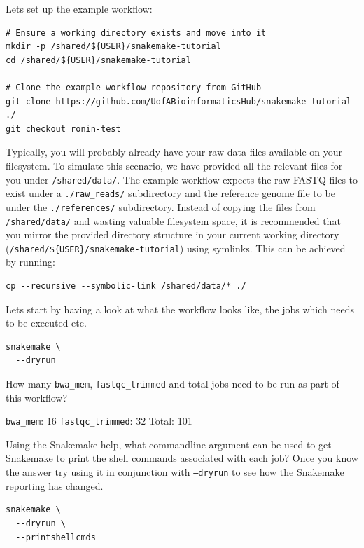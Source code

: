 \begin{steps}

Lets set up the example workflow:

\begin{lstlisting}
# Ensure a working directory exists and move into it
mkdir -p /shared/${USER}/snakemake-tutorial
cd /shared/${USER}/snakemake-tutorial

# Clone the example workflow repository from GitHub
git clone https://github.com/UofABioinformaticsHub/snakemake-tutorial ./
git checkout ronin-test
\end{lstlisting}

Typically, you will probably already have your raw data files available on your filesystem. To simulate this scenario, we have provided
all the relevant files for you under \texttt{/shared/data/}. The example workflow expects the raw FASTQ files to exist under a \texttt{./raw\_reads/}
subdirectory and the reference genome file to be under the \texttt{./references/} subdirectory. Instead of copying the files from \texttt{/shared/data/}
and wasting valuable filesystem space, it is recommended that you mirror the provided directory structure in your current working directory
(\texttt{/shared/\$\{USER\}/snakemake-tutorial}) using symlinks. This can be achieved by running:

\begin{lstlisting}
cp --recursive --symbolic-link /shared/data/* ./
\end{lstlisting}

Lets start by having a look at what the workflow looks like, the jobs which needs to be executed etc.

\begin{lstlisting}
snakemake \
  --dryrun
\end{lstlisting}
\end{steps}

\begin{questions}

How many \texttt{bwa\_mem}, \texttt{fastqc\_trimmed} and total jobs need to be run as part of this workflow?

\begin{answer}

\texttt{bwa\_mem}: 16
\texttt{fastqc\_trimmed}: 32
Total: 101

\end{answer}

Using the Snakemake help, what commandline argument can be used to get Snakemake to print the shell commands associated with each job? Once you know the answer
try using it in conjunction with \texttt{--dryrun} to see how the Snakemake reporting has changed.

\begin{answer}
\begin{lstlisting}
snakemake \
  --dryrun \
  --printshellcmds
\end{lstlisting}
\end{answer}

\end{questions}

